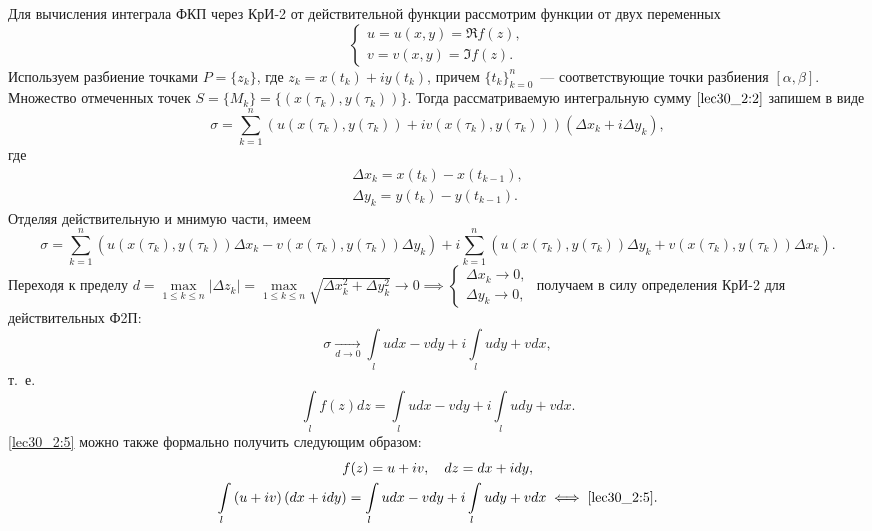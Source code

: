 \documentclass[../../main.tex]{subfiles}
\begin{document}
Для вычисления интеграла ФКП через КрИ-2 от действительной функции 
рассмотрим функции от двух переменных
\begin{equation*}
 \begin{cases}
  u = u\left(x, y\right) = \Re f(z),\\
  v = v\left(x, y\right) = \Im f(z).
 \end{cases}
\end{equation*}
Используем разбиение точками $P = \{z_k\}$, где $z_k = x(t_k) + iy(t_k)$, 
причем $\{t_k\}_{k=0}^n $~--- соответствующие точки разбиения 
$\left[\alpha,\beta\right]$. Множество отмеченных точек
$S = \{M_k\} = \{(x(\tau_k), y(\tau_k))\}$. Тогда рассматриваемую интегральную 
сумму 
$\eqref{lec30_2:2}$ запишем в виде
\[\sigma = \sum\limits_{k=1}^n{\left(u(x(\tau_k), y(\tau_k))
+ iv(x(\tau_k), y(\tau_k))\right)\left(\Delta x_k + 
i\Delta y_k\right)},\] 
где
\begin{gather*}
\Delta x_k = x(t_k) - x(t_{k-1}),\\
\Delta y_k = y(t_k) - y(t_{k-1}).
\end{gather*}
Отделяя действительную и мнимую части, имеем
\[
\sigma = \sum_{k=1}^n{(u(x(\tau_k), y(\tau_k))\Delta x_k -
v(x(\tau_k), y(\tau_k))\Delta y_k)} + 
i\sum_{k=1}^n{(u(x(\tau_k), y(\tau_k))\Delta y_k + 
v(x(\tau_k), y(\tau_k))\Delta x_k)}.
\]
Переходя к пределу 
$d = \underset{1 \leq k \leq n}{\max}|\Delta z_k| = 
\underset{1 \leq k \leq n}{\max}\sqrt{\Delta x_k^2 + \Delta y_k^2}
\longrightarrow 0 \implies
\begin{cases}
    \Delta x_k \longrightarrow 0,\\
    \Delta y_k \longrightarrow 0,
\end{cases}$ \hspace{-1em}
получаем в силу определения КрИ-2 для действительных Ф2П:
\[
\sigma \underset{d \to 0}{\longrightarrow} \int\limits_l{
udx - vdy} + i\int\limits_l{udy + vdx},
\]
т.~е.
\begin{equation}
    \label{lec30_2:5}    
    \int\limits_{l}{f(z)dz} = \int\limits_l{udx - vdy} + 
    i\int\limits_l{udy + vdx}.
\end{equation}
\eqref{lec30_2:5} можно также формально получить следующим образом:
\begin{gather*}
f(z) = u + iv, \quad
dz = dx + idy, \\
\int\limits_l{\left(u+iv\right)\left(dx + idy\right)} = 
\int\limits_l{udx - vdy} + i\int\limits_l{udy + vdx} 
\iff \eqref{lec30_2:5}.
\end{gather*}
\end{document}
